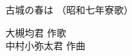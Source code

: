 \documentclass[10pt,b5j]{tarticle} %
\begin{document}
\begin{minipage}[c]{0.7\hsize} %
    \begin{center}
        {\LARGE
            古城の春は %
        }
        {\small 
            （昭和七年寮歌） %
        }
    \end{center}
\end{minipage}
\begin{minipage}[c]{0.3\hsize} %
    \begin{flushright} %
        大槻均君 作歌\\中村小弥太君 作曲 %
    \end{flushright}
\end{minipage}
\end{document}
